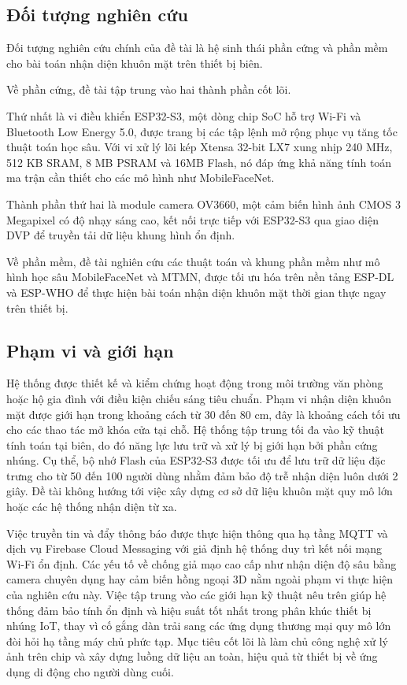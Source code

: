 \subsection{Đối tượng nghiên cứu}
Đối tượng nghiên cứu chính của đề tài là hệ sinh thái phần cứng và phần mềm cho bài toán nhận diện khuôn mặt trên thiết bị biên.

Về phần cứng, đề tài tập trung vào hai thành phần cốt lõi.

Thứ nhất là vi điều khiển ESP32-S3, một dòng chip SoC hỗ trợ Wi-Fi và Bluetooth Low Energy 5.0, được trang bị các tập lệnh mở rộng phục vụ tăng tốc thuật toán học sâu. Với vi xử lý lõi kép Xtensa 32-bit LX7 xung nhịp 240 MHz, 512 KB SRAM, 8 MB PSRAM và 16MB Flash, nó đáp ứng khả năng tính toán ma trận cần thiết cho các mô hình như MobileFaceNet.

Thành phần thứ hai là module camera OV3660, một cảm biến hình ảnh CMOS 3 Megapixel có độ nhạy sáng cao, kết nối trực tiếp với ESP32-S3 qua giao diện DVP để truyền tải dữ liệu khung hình ổn định.

Về phần mềm, đề tài nghiên cứu các thuật toán và khung phần mềm như mô hình học sâu MobileFaceNet và MTMN, được tối ưu hóa trên nền tảng ESP-DL và ESP-WHO để thực hiện bài toán nhận diện khuôn mặt thời gian thực ngay trên thiết bị.

\subsection{Phạm vi và giới hạn}
Hệ thống được thiết kế và kiểm chứng hoạt động trong môi trường văn phòng hoặc hộ gia đình với điều kiện chiếu sáng tiêu chuẩn. Phạm vi nhận diện khuôn mặt được giới hạn trong khoảng cách từ 30 đến 80 cm, đây là khoảng cách tối ưu cho các thao tác mở khóa cửa tại chỗ. Hệ thống tập trung tối đa vào kỹ thuật tính toán tại biên, do đó năng lực lưu trữ và xử lý bị giới hạn bởi phần cứng nhúng. Cụ thể, bộ nhớ Flash của ESP32-S3 được tối ưu để lưu trữ dữ liệu đặc trưng cho từ 50 đến 100 người dùng nhằm đảm bảo độ trễ nhận diện luôn dưới 2 giây. Đề tài không hướng tới việc xây dựng cơ sở dữ liệu khuôn mặt quy mô lớn hoặc các hệ thống nhận diện từ xa.

Việc truyền tin và đẩy thông báo được thực hiện thông qua hạ tầng MQTT và dịch vụ Firebase Cloud Messaging với giả định hệ thống duy trì kết nối mạng Wi-Fi ổn định. Các yếu tố về chống giả mạo cao cấp như nhận diện độ sâu bằng camera chuyên dụng hay cảm biến hồng ngoại 3D nằm ngoài phạm vi thực hiện của nghiên cứu này. Việc tập trung vào các giới hạn kỹ thuật nêu trên giúp hệ thống đảm bảo tính ổn định và hiệu suất tốt nhất trong phân khúc thiết bị nhúng IoT, thay vì cố gắng dàn trải sang các ứng dụng thương mại quy mô lớn đòi hỏi hạ tầng máy chủ phức tạp. Mục tiêu cốt lõi là làm chủ công nghệ xử lý ảnh trên chip và xây dựng luồng dữ liệu an toàn, hiệu quả từ thiết bị về ứng dụng di động cho người dùng cuối.

